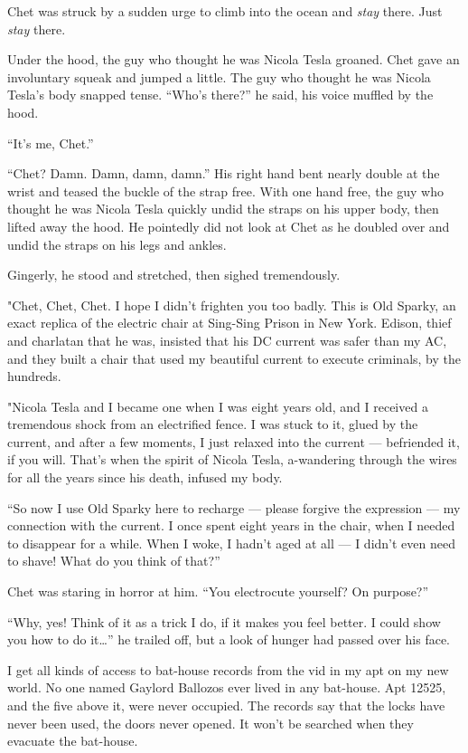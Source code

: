 Chet was struck by a sudden urge to climb into the ocean and
\emph{stay} there. Just \emph{stay} there.

Under the hood, the guy who thought he was Nicola Tesla groaned.
Chet gave an involuntary squeak and jumped a little. The guy who
thought he was Nicola Tesla's body snapped tense. ``Who's there?''
he said, his voice muffled by the hood.

``It's me, Chet.''

``Chet? Damn. Damn, damn, damn.'' His right hand bent nearly double
at the wrist and teased the buckle of the strap free. With one hand
free, the guy who thought he was Nicola Tesla quickly undid the
straps on his upper body, then lifted away the hood. He pointedly
did not look at Chet as he doubled over and undid the straps on his
legs and ankles.

Gingerly, he stood and stretched, then sighed tremendously.

"Chet, Chet, Chet. I hope I didn't frighten you too badly. This is
Old Sparky, an exact replica of the electric chair at Sing-Sing
Prison in New York. Edison, thief and charlatan that he was,
insisted that his DC current was safer than my AC, and they built a
chair that used my beautiful current to execute criminals, by the
hundreds.

"Nicola Tesla and I became one when I was eight years old, and I
received a tremendous shock from an electrified fence. I was stuck
to it, glued by the current, and after a few moments, I just
relaxed into the current --- befriended it, if you will. That's
when the spirit of Nicola Tesla, a-wandering through the wires for
all the years since his death, infused my body.

``So now I use Old Sparky here to recharge --- please forgive the expression 
--- my connection with the current. I once spent eight years in the chair, when 
I needed to disappear for a while. When I woke, I hadn't aged at all --- I 
didn't even need to shave! What do you think of that?''

Chet was staring in horror at him.
``You electrocute yourself? On purpose?''

``Why, yes! Think of it as a trick I do, if it makes you feel better. I could 
show you how to do it\ldots{}''
he trailed off, but a look of hunger had passed over his face.

\tb

I get all kinds of access to bat-house records from the vid in my
apt on my new world. No one named Gaylord Ballozos ever lived in
any bat-house. Apt 12525, and the five above it, were never
occupied. The records say that the locks have never been used, the
doors never opened. It won't be searched when they evacuate the
bat-house.

